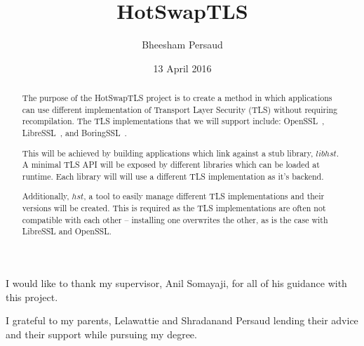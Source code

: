\documentclass[12pt,oneside]{report}
\title{HotSwapTLS}
\author{Bheesham Persaud}
\date{13 April 2016}
\begin{document}

\cartitle


\begin{abstract}
	The purpose of the HotSwapTLS project is to create a method in which
	applications can use different implementation of Transport Layer
	Security (TLS) without requiring recompilation. The TLS implementations
	that we will support include: OpenSSL~\cite{website:openssl},
	LibreSSL~\cite{website:libressl}, and
	BoringSSL~\cite{website:boringssl}.

	This will be achieved by building applications which link against a stub
	library, $libhst$. A minimal TLS API will be exposed by different
	libraries which can be loaded at runtime. Each library will will use a
	different TLS implementation as it's backend.

	Additionally, $hst$, a tool to easily manage different TLS
	implementations and their versions will be created. This is required as
	the TLS implementations are often not compatible with each other --
	installing one overwrites the other, as is the case with LibreSSL and
	OpenSSL.
\end{abstract}


\begin{caracks}
	I would like to thank my supervisor, Anil Somayaji, for all of his
	guidance with this project.

	I grateful to my parents, Lelawattie and Shradanand Persaud lending
	their advice and their support while pursuing my degree.
\end{caracks}


\cartocandlists

\end{document}
